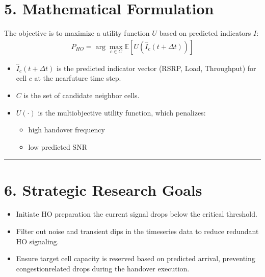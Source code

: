 \documentclass[letterpaper,10pt,english]{sphinxmanual}
\begin{document}
\section{5. Mathematical Formulation}
\label{\detokenize{overview:mathematical-formulation}}
\sphinxAtStartPar
The objective is to maximize a utility function \(U\) based on predicted indicators \(I\):
\begin{equation*}
\begin{split}
P_{HO} = \arg\max_{c \in C} \mathbb{E}\left[ U\left(\hat{I}_c(t+\Delta t)\right) \right]
\end{split}
\end{equation*}
\sphinxAtStartPar
{}
\begin{itemize}
\item {} 
\sphinxAtStartPar
\(\hat{I}_c(t+\Delta t)\) is the predicted indicator vector (RSRP, Load, Throughput) for cell \(c\) at the near\sphinxhyphen{}future time step.

\item {} 
\sphinxAtStartPar
\(C\) is the set of candidate neighbor cells.

\item {} 
\sphinxAtStartPar
\(U(\cdot)\) is the multi\sphinxhyphen{}objective utility function, which penalizes:
\begin{itemize}
\item {} 
\sphinxAtStartPar
high handover frequency

\item {} 
\sphinxAtStartPar
low predicted SNR

\end{itemize}

\end{itemize}


\bigskip\hrule\bigskip



\section{6. Strategic Research Goals}
\label{\detokenize{overview:strategic-research-goals}}\begin{itemize}
\item {} 
\sphinxAtStartPar
{} Initiate HO preparation  the current signal drops below the critical threshold.

\item {} 
\sphinxAtStartPar
{} Filter out noise and transient dips in the time\sphinxhyphen{}series data to reduce redundant HO signaling.

\item {} 
\sphinxAtStartPar
{} Ensure target cell capacity is reserved based on predicted arrival, preventing congestion\sphinxhyphen{}related drops during the handover execution.

\end{itemize}
\end{document}
